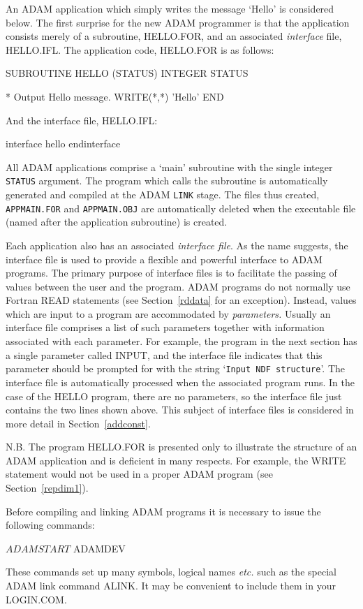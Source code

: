 \documentclass[twoside,11pt,nolof]{starlink}
\begin{document}
An ADAM application which simply writes the message {`Hello'}
is considered below.
The first surprise for the new ADAM programmer is that the application
consists merely of a subroutine, HELLO.FOR, and an
associated {\sl interface\/} file, HELLO.IFL.
The application code, HELLO.FOR is as follows:
\begin{terminalv}
      SUBROUTINE HELLO (STATUS)
      INTEGER STATUS

*   Output Hello message.
      WRITE(*,*) 'Hello'
      END
\end{terminalv}
And the  interface file, HELLO.IFL:
\begin{terminalv}
interface hello
endinterface
\end{terminalv}
All ADAM applications comprise a `main' subroutine with the single
integer \texttt{STATUS} argument.
The program which calls the subroutine is automatically
generated and compiled at the ADAM \texttt{LINK} stage.
The files thus created, \texttt{APPMAIN.FOR} and \texttt{APPMAIN.OBJ}
are automatically deleted when the executable file (named after the
application subroutine) is created.

Each application also has an associated {\sl interface file}.
As the name suggests, the interface file is used to provide a flexible
and powerful interface to  ADAM programs.
The primary purpose of interface files is to facilitate the passing
of values between the user and the program.
ADAM programs do not normally use Fortran READ statements
(see Section~\ref{rddata} for an exception).
Instead, values which are input to  a program are accommodated by
{\sl parameters.}
Usually an interface file comprises  a list of
such parameters together with information associated with each parameter.
For example, the program in the next section has a single parameter
called INPUT, and the interface file indicates that this  parameter should
be prompted for with the string `\texttt{Input NDF structure}'.
The interface file is automatically processed when the associated program
runs.
In the case of the HELLO program, there are no parameters, so the interface
file just contains the two lines shown above.
This subject of interface files is considered in more detail in
Section~\ref{addconst}.

N.B. The program HELLO.FOR is presented only to illustrate the
structure of an ADAM application and is deficient in many respects.
For example, the WRITE statement would not be used in
a proper ADAM program (see Section~\ref{repdim1}).

Before compiling and linking ADAM programs it is necessary to issue the
following commands:
\begin{terminalv}
$ ADAMSTART
$ ADAMDEV
\end{terminalv}
These commands set up many symbols, logical names \textit{etc.}
such as the special ADAM link command ALINK.
It may be convenient to include them in your LOGIN.COM.
\end{document}
